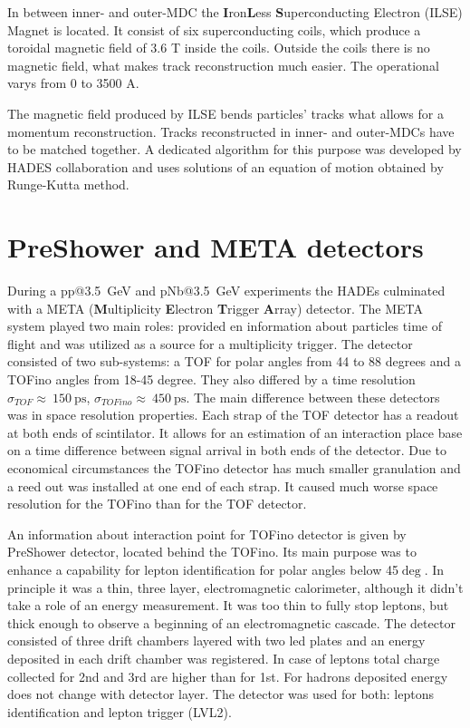 In between inner- and outer-MDC the \textbf{I}ron\textbf{L}ess \textbf{S}uperconducting Electron (ILSE) Magnet is located. It consist of six superconducting coils, which produce a toroidal magnetic field of 3.6 T inside the coils. Outside the coils there is no magnetic field, what makes track reconstruction much easier. The operational varys from 0 to 3500 A. 

The magnetic field produced by ILSE bends particles' tracks what allows for a momentum reconstruction. Tracks reconstructed in inner- and outer-MDCs have to be matched together. A dedicated algorithm for this purpose was developed by HADES collaboration and uses solutions of an equation of motion obtained by Runge-Kutta method.

\section{PreShower and META detectors}
During a pp@3.5~GeV and pNb@3.5~GeV experiments the HADEs culminated with a META (\textbf{M}ultiplicity \textbf{E}lectron \textbf{T}rigger \textbf{A}rray) detector. The META system played two main roles: provided en information about particles time of flight and was utilized as a source for a multiplicity trigger. The detector consisted of two sub-systems: a TOF for polar angles from 44 to 88 degrees and a TOFino angles from 18-45 degree. They also differed by a time resolution $\sigma_{TOF}\approx~150~\mathrm{ps}$, $\sigma_{TOFino}\approx~450~\mathrm{ps}$. The main difference between these detectors was in space resolution properties. Each strap of the TOF detector has a readout at both ends of scintilator. It allows for an estimation of an interaction place base on a time difference between signal arrival in both ends of the detector. Due to economical circumstances the TOFino detector has much smaller granulation and a reed out was installed at one end of each strap. It caused much worse space resolution for the TOFino than for the TOF detector.

An information about interaction point for TOFino detector is given by PreShower detector, located behind the TOFino. Its main purpose was to enhance a capability for lepton identification for polar angles below 45$\deg$. In principle it was a thin, three layer, electromagnetic calorimeter, although it didn't take a role of an energy measurement. It was too thin to fully stop leptons, but thick enough to observe a beginning of an electromagnetic cascade. The detector consisted of three drift chambers layered with two led plates and an energy deposited in each drift chamber was registered. In case of leptons total charge collected for 2nd and 3rd are higher than for 1st. For hadrons deposited energy does not change with detector layer. The detector was used for both: leptons identification and lepton trigger (LVL2).


